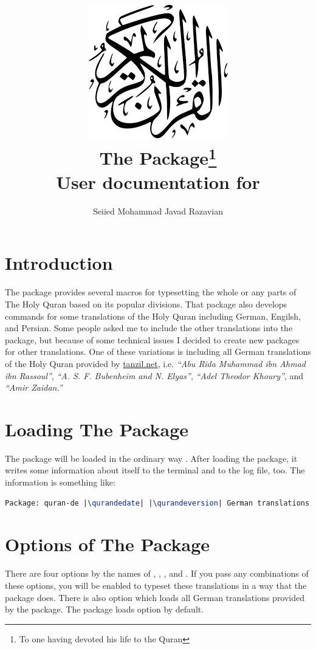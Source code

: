 \documentclass[a4paper]{ltxdoc}
\title{\includegraphics[scale=.3]{quran.png}\\
The \xpackage{quran-de} Package\footnote{To one having devoted his life to the Quran}\\
\Large User documentation for \qurandeversion}
\author{Seiied Mohammad Javad Razavian\\\xemail{javadr@gmail.com}}
\date{\qurandedate}
\begin{document}
\maketitle

\tableofcontents

\section{Introduction}
The  package provides several macros for
typesetting the whole or any parts of The Holy Quran based on its popular divisions. That package also develops 
commands for some translations of the Holy Quran including German, Engilsh, and Persian. 
Some people asked me to include the other translations into the  package, 
but because of some technical issues I decided to create new packages for other translations. 
One of these variations is  including all German translations of the Holy Quran 
provided by \url{tanzil.net}, i.e. \emph{``Abu Rida Muhammad ibn Ahmad ibn Rassoul''},
\emph{``A. S. F. Bubenheim and N. Elyas''}, \emph{``Adel Theodor Khoury''}, 
and \emph{``Amir Zaidan.''}


\section{Loading The Package}
The package will be loaded in the ordinary way
.
After loading the package, it writes some information about itself to the
terminal and to the log file, too. The information is something like:

\begin{lstlisting}[style=BashInputStyle, language=tex, escapechar={|}]
Package: quran-de |\qurandedate| |\qurandeversion| German translations extension to the quran package.
\end{lstlisting}


\section{Options of The Package}\label{sec:qurantypesetting}
There are four options by the names of , , , 
and .
If you pass any combinations of these options, you will be enabled to typeset these translations in a way 
that the  package does. 
There is also  option which loads all German translations provided by the  package.
The package loads  option by default.
\end{document}
